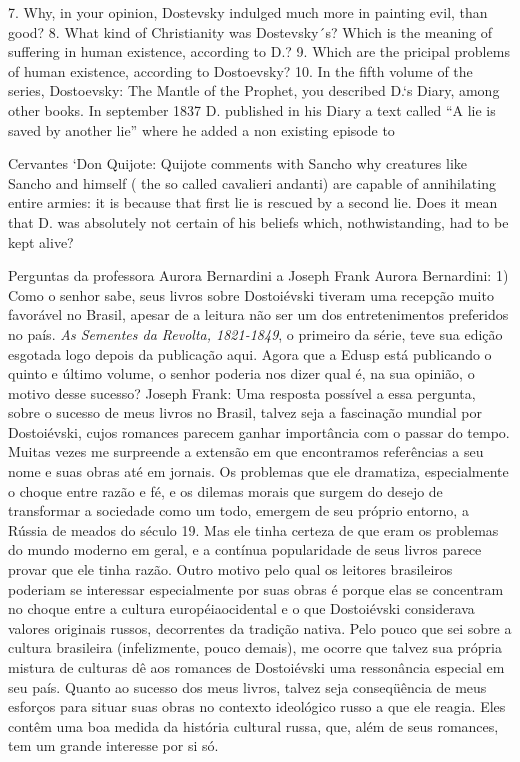 7. Why, in your opinion, Dostevsky indulged much more in painting evil,
than good? 8. What kind of Christianity was Dostevsky´s? Which is the
meaning of suffering in human existence, according to D.? 9. Which are
the pricipal problems of human existence, according to Dostoevsky? 10.
In the fifth volume of the series, Dostoevsky: The Mantle of the
Prophet, you described D.`s Diary, among other books. In september 1837
D. published in his Diary a text called ``A lie is saved by another
lie'' where he added a non existing episode to

Cervantes `Don Quijote: Quijote comments with Sancho why creatures like
Sancho and himself ( the so called cavalieri andanti) are capable of
annihilating entire armies: it is because that first lie is rescued by a
second lie. Does it mean that D. was absolutely not certain of his
beliefs which, nothwistanding, had to be kept alive?

Perguntas da professora Aurora Bernardini a Joseph Frank Aurora
Bernardini: 1) Como o senhor sabe, seus livros sobre Dostoiévski tiveram
uma recepção muito favorável no Brasil, apesar de a leitura não ser um
dos entretenimentos preferidos no país. \emph{As Sementes da Revolta,
1821-1849}, o primeiro da série, teve sua edição esgotada logo depois da
publicação aqui. Agora que a Edusp está publicando o quinto e último
volume, o senhor poderia nos dizer qual é, na sua opinião, o motivo
desse sucesso? Joseph Frank: Uma resposta possível a essa pergunta,
sobre o sucesso de meus livros no Brasil, talvez seja a fascinação
mundial por Dostoiévski, cujos romances parecem ganhar importância com o
passar do tempo. Muitas vezes me surpreende a extensão em que
encontramos referências a seu nome e suas obras até em jornais. Os
problemas que ele dramatiza, especialmente o choque entre razão e fé, e
os dilemas morais que surgem do desejo de transformar a sociedade como
um todo, emergem de seu próprio entorno, a Rússia de meados do século
19. Mas ele tinha certeza de que eram os problemas do mundo moderno em
geral, e a contínua popularidade de seus livros parece provar que ele
tinha razão. Outro motivo pelo qual os leitores brasileiros poderiam se
interessar especialmente por suas obras é porque elas se concentram no
choque entre a cultura européiaocidental e o que Dostoiévski considerava
valores originais russos, decorrentes da tradição nativa. Pelo pouco que
sei sobre a cultura brasileira (infelizmente, pouco demais), me ocorre
que talvez sua própria mistura de culturas dê aos romances de
Dostoiévski uma ressonância especial em seu país. Quanto ao sucesso dos
meus livros, talvez seja conseqüência de meus esforços para situar suas
obras no contexto ideológico russo a que ele reagia. Eles contêm uma boa
medida da história cultural russa, que, além de seus romances, tem um
grande interesse por si só.

